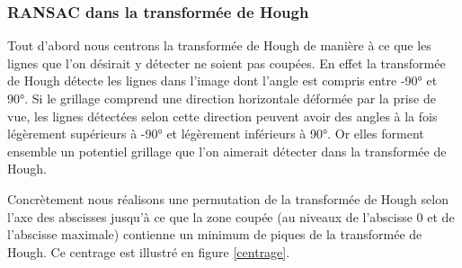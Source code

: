 \subsubsection{RANSAC dans la transformée de Hough}
Tout d'abord nous centrons la transformée de Hough de manière à ce que les lignes que l'on désirait y détecter ne soient pas coupées. En effet la transformée de Hough détecte les lignes dans l'image dont l'angle est compris entre -90° et 90°. Si le grillage comprend une direction horizontale déformée par la prise de vue, les lignes détectées selon cette direction peuvent avoir des angles à la fois légèrement supérieurs à -90° et légèrement inférieurs à 90°. Or elles forment ensemble un potentiel grillage que l'on aimerait détecter dans la transformée de Hough.

Concrètement nous réalisons une permutation de la transformée de Hough selon l'axe des abscisses jusqu'à ce que la zone coupée (au niveaux de  l'abscisse 0 et de l'abscisse maximale) contienne un minimum de piques de la transformée de Hough. Ce centrage est illustré en figure \ref{centrage}.

